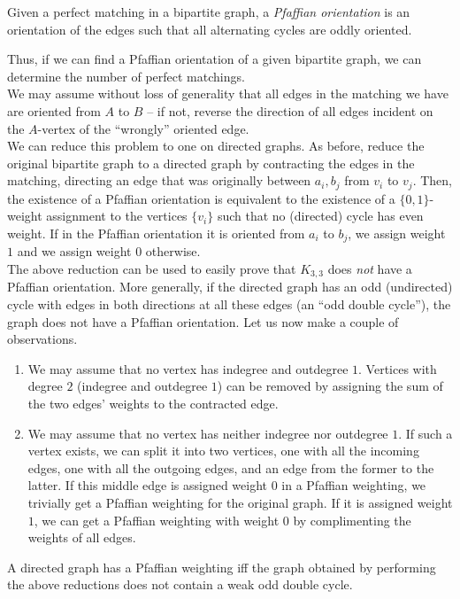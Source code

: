 \begin{fdef}
	Given a perfect matching in a bipartite graph, a \emph{Pfaffian orientation} is an orientation of the edges such that all alternating cycles are oddly oriented.
\end{fdef}
Thus, if we can find a Pfaffian orientation of a given bipartite graph, we can determine the number of perfect matchings.\\
We may assume without loss of generality that all edges in the matching we have are oriented from $A$ to $B$ -- if not, reverse the direction of all edges incident on the $A$-vertex of the ``wrongly'' oriented edge.\\
We can reduce this problem to one on directed graphs. As before, reduce the original bipartite graph to a directed graph by contracting the edges in the matching, directing an edge that was originally between $a_i,b_j$ from $v_i$ to $v_j$. Then, the existence of a Pfaffian orientation is equivalent to the existence of a $\{0,1\}$-weight assignment to the vertices $\{v_i\}$ such that no (directed) cycle has even weight. If in the Pfaffian orientation it is oriented from $a_i$ to $b_j$, we assign weight $1$ and we assign weight $0$ otherwise.\\
The above reduction can be used to easily prove that $K_{3,3}$ does \emph{not} have a Pfaffian orientation. More generally, if the directed graph has an odd (undirected) cycle with edges in both directions at all these edges (an ``odd double cycle''), the graph does not have a Pfaffian orientation. Let us now make a couple of observations.
\begin{enumerate}
	\item We may assume that no vertex has indegree and outdegree $1$. Vertices with degree $2$ (indegree and outdegree $1$) can be removed by assigning the sum of the two edges' weights to the contracted edge.
	\item We may assume that no vertex has neither indegree nor outdegree $1$. If such a vertex exists, we can split it into two vertices, one with all the incoming edges, one with all the outgoing edges, and an edge from the former to the latter. If this middle edge is assigned weight $0$ in a Pfaffian weighting, we trivially get a Pfaffian weighting for the original graph. If it is assigned weight $1$, we can get a Pfaffian weighting with weight $0$ by complimenting the weights of all edges.
\end{enumerate}

\begin{ftheo}
	A directed graph has a Pfaffian weighting iff the graph obtained by performing the above reductions does not contain a weak odd double cycle.
\end{ftheo}

